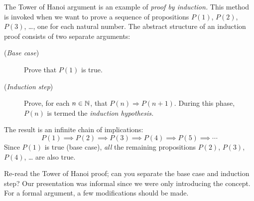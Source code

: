 



The Tower of Hanoi argument is an example of \emph{proof by induction.} This method is invoked when we want to prove a sequence of propositions $P(1)$, $P(2)$, $P(3)$, \ldots, one for each natural number. The abstract structure of an induction proof consists of two separate arguments:
\begin{description}%
  \item[\normalfont(\emph{Base case})] Prove that $P(1)$ is true.
  \item[\normalfont(\emph{Induction step})] Prove, for each $n\in\mathbb{N}$, that $P(n)\Longrightarrow P(n+1)$. During this phase, $P(n)$ is termed the \emph{induction hypothesis.}
\end{description}
The result is an infinite chain of implications:
\[
	P(1)\implies P(2)\implies P(3)\implies P(4)\implies P(5)\implies \cdots
\]
Since $P(1)$ is true (base case), \emph{all} the remaining propositions $P(2)$, $P(3)$, $P(4)$, \ldots{} are also true.\smallbreak

Re-read the Tower of Hanoi proof; can you separate the base case and induction step? Our presentation was informal since we were only introducing the concept. For a formal argument, a few modifications should be made.


